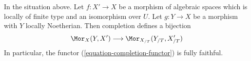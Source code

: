 %
\begin{lemma}
\label{lemma-completion-functor-fully-faithful}
In the situation above. Let $f : X' \to X$ be a morphism of algebraic spaces
which is locally of finite type and an isomorphism over $U$. Let
$g : Y \to X$ be a morphism with $Y$ locally Noetherian. Then completion
defines a bijection
$$
\Mor_X(Y, X') \longrightarrow \Mor_{X_{/T}}(Y_{/T}, X'_{/T})
$$
In particular, the functor (\ref{equation-completion-functor}) is
fully faithful.
\end{lemma}

